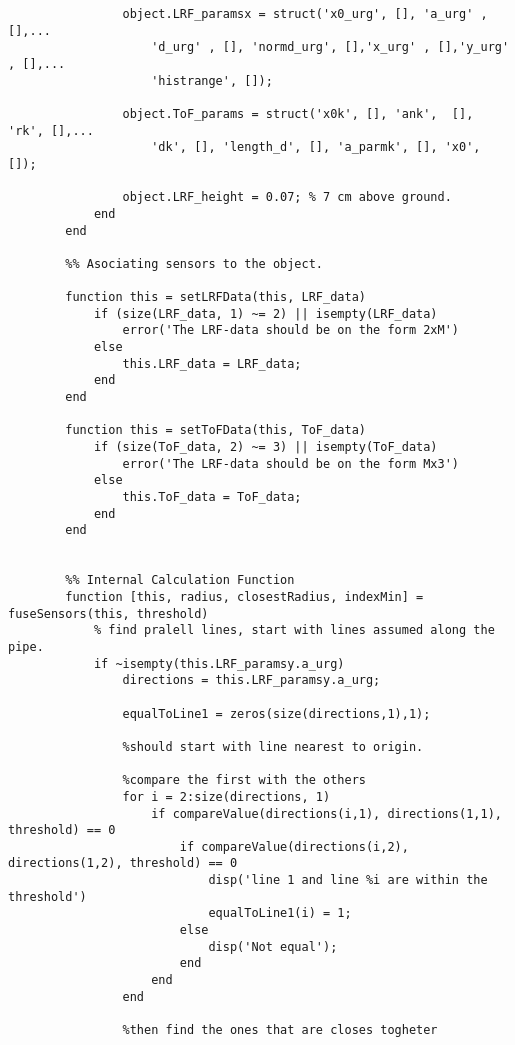 \begin{lstlisting}
                object.LRF_paramsx = struct('x0_urg', [], 'a_urg' ,[],...
                    'd_urg' , [], 'normd_urg', [],'x_urg' , [],'y_urg' , [],...
                    'histrange', []);
            
                object.ToF_params = struct('x0k', [], 'ank',  [], 'rk', [],...
                    'dk', [], 'length_d', [], 'a_parmk', [], 'x0', []);
                
                object.LRF_height = 0.07; % 7 cm above ground.
            end
        end
        
        %% Asociating sensors to the object.
        
        function this = setLRFData(this, LRF_data)
            if (size(LRF_data, 1) ~= 2) || isempty(LRF_data)
                error('The LRF-data should be on the form 2xM')
            else
                this.LRF_data = LRF_data;
            end
        end
        
        function this = setToFData(this, ToF_data)
            if (size(ToF_data, 2) ~= 3) || isempty(ToF_data) 
                error('The LRF-data should be on the form Mx3')
            else
                this.ToF_data = ToF_data; 
            end
        end
        
        
        %% Internal Calculation Function
        function [this, radius, closestRadius, indexMin] = fuseSensors(this, threshold)
            % find pralell lines, start with lines assumed along the pipe.
            if ~isempty(this.LRF_paramsy.a_urg)
                directions = this.LRF_paramsy.a_urg;
                
                equalToLine1 = zeros(size(directions,1),1);
                
                %should start with line nearest to origin.
                
                %compare the first with the others
                for i = 2:size(directions, 1)
                    if compareValue(directions(i,1), directions(1,1), threshold) == 0
                        if compareValue(directions(i,2), directions(1,2), threshold) == 0
                            disp('line 1 and line %i are within the threshold')
                            equalToLine1(i) = 1;
                        else
                            disp('Not equal');
                        end
                    end
                end
                
                %then find the ones that are closes togheter
                

\end{lstlisting}
